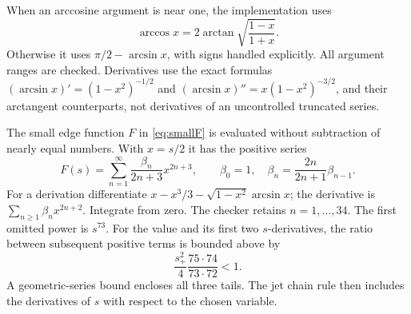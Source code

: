 \documentclass[11pt]{article}
\numberwithin{equation}{section}
\theoremstyle{definition}\newtheorem{definition}[theorem]{Definition}
\theoremstyle{remark}\newtheorem{remark}[theorem]{Remark}
\begin{document}
When an arccosine argument is near one, the implementation uses
\[
 \arccos x=2\arctan\sqrt{\frac{1-x}{1+x}}.
\]
Otherwise it uses $\pi/2-\arcsin x$, with signs handled explicitly.
All argument ranges are checked. Derivatives use the exact formulas
$(\arcsin x)'=(1-x^2)^{-1/2}$ and
$(\arcsin x)''=x(1-x^2)^{-3/2}$, and their arctangent counterparts,
not derivatives of an uncontrolled truncated series.

The small edge function $F$ in \cref{eq:smallF} is evaluated without
subtraction of nearly equal numbers. With $x=s/2$ it has the positive series
\begin{equation}\label{eq:Fseries}
 F(s)=\sum_{n=1}^\infty\frac{\beta_n}{2n+3}x^{2n+3},\qquad
 \beta_0=1,\quad \beta_n=\frac{2n}{2n+1}\beta_{n-1}.
\end{equation}
For a derivation differentiate
$x-x^3/3-\sqrt{1-x^2}\arcsin x$; the derivative is
$\sum_{n\ge1}\beta_n x^{2n+2}$. Integrate from zero.
The checker retains $n=1,\ldots,34$. The first omitted power is $s^{73}$.
For the value and its first two $s$-derivatives, the ratio between subsequent
positive terms is bounded above by
\[
 \frac{s_+^2}{4}\frac{75\cdot74}{73\cdot72}<1.
\]
A geometric-series bound encloses all three tails. The jet chain rule then
includes the derivatives of $s$ with respect to the chosen variable.
\end{document}
